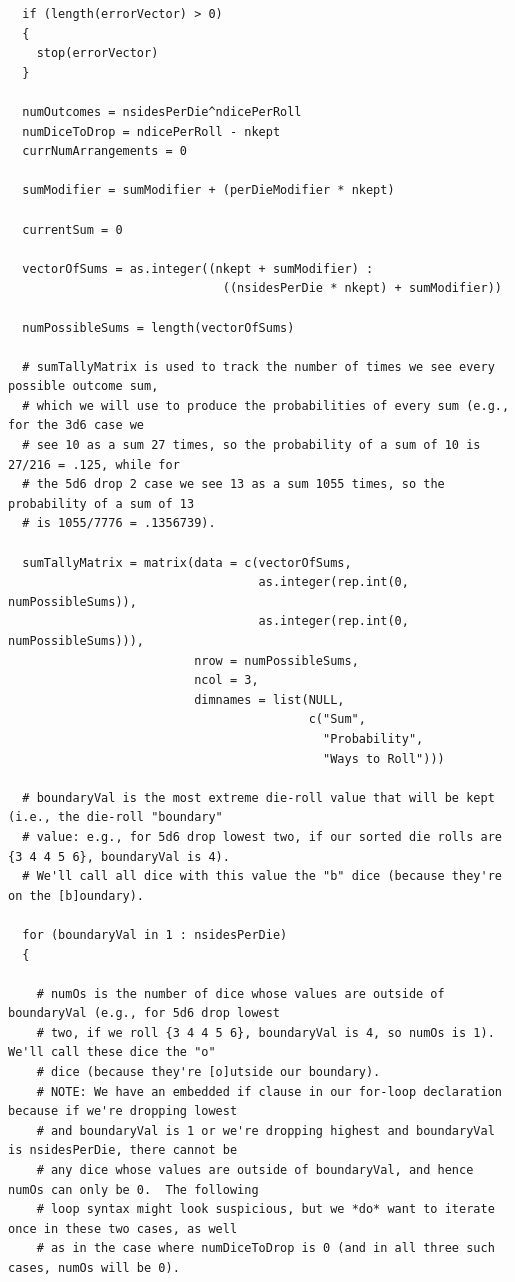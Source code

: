 \documentclass[12pt]{article}
\begin{document}
\begin{lstlisting}
  if (length(errorVector) > 0)
  {
    stop(errorVector)
  }
  
  numOutcomes = nsidesPerDie^ndicePerRoll
  numDiceToDrop = ndicePerRoll - nkept
  currNumArrangements = 0
  
  sumModifier = sumModifier + (perDieModifier * nkept)
  
  currentSum = 0
  
  vectorOfSums = as.integer((nkept + sumModifier) :
                              ((nsidesPerDie * nkept) + sumModifier))
  
  numPossibleSums = length(vectorOfSums)
  
  # sumTallyMatrix is used to track the number of times we see every possible outcome sum,
  # which we will use to produce the probabilities of every sum (e.g., for the 3d6 case we 
  # see 10 as a sum 27 times, so the probability of a sum of 10 is 27/216 = .125, while for
  # the 5d6 drop 2 case we see 13 as a sum 1055 times, so the probability of a sum of 13
  # is 1055/7776 = .1356739).
  
  sumTallyMatrix = matrix(data = c(vectorOfSums,
                                   as.integer(rep.int(0, numPossibleSums)),
                                   as.integer(rep.int(0, numPossibleSums))),
                          nrow = numPossibleSums,
                          ncol = 3,
                          dimnames = list(NULL,
                                          c("Sum",
                                            "Probability",
                                            "Ways to Roll")))
  
  # boundaryVal is the most extreme die-roll value that will be kept (i.e., the die-roll "boundary"
  # value: e.g., for 5d6 drop lowest two, if our sorted die rolls are {3 4 4 5 6}, boundaryVal is 4).
  # We'll call all dice with this value the "b" dice (because they're on the [b]oundary).
  
  for (boundaryVal in 1 : nsidesPerDie)
  {
    
    # numOs is the number of dice whose values are outside of boundaryVal (e.g., for 5d6 drop lowest 
    # two, if we roll {3 4 4 5 6}, boundaryVal is 4, so numOs is 1).  We'll call these dice the "o"
    # dice (because they're [o]utside our boundary).  
    # NOTE: We have an embedded if clause in our for-loop declaration because if we're dropping lowest 
    # and boundaryVal is 1 or we're dropping highest and boundaryVal is nsidesPerDie, there cannot be 
    # any dice whose values are outside of boundaryVal, and hence numOs can only be 0.  The following 
    # loop syntax might look suspicious, but we *do* want to iterate once in these two cases, as well
    # as in the case where numDiceToDrop is 0 (and in all three such cases, numOs will be 0).
    

\end{lstlisting}
\end{document}
